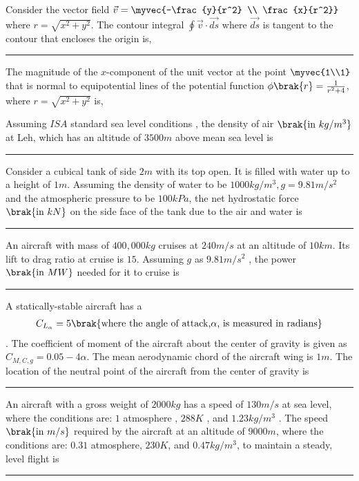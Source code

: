         \item Consider the vector field $\vec{v}=\myvec{-\frac{y}{r^2} \\ \frac{x}{r^2}}$ where $r= \sqrt{x^2+y^2}$. The contour integral $ \oint \vec{v} \cdot \vec{ds}$ where $\vec{ds}$ is tangent to the contour that encloses the origin is, \rule{2cm}{0.2pt} 
        \item The magnitude of the $x$-component of the unit vector at the point $\myvec{1\\1}$ that is normal to equipotential lines of the potential function $\phi\brak{r}=\frac{1}{r^2+4}$, where $r=\sqrt{x^2+y^2}$ is,
        \item Assuming $ISA$ standard sea level conditions , the density of air $\brak{\text{in } kg/m^3}$ at Leh, which has an altitude of $3500m$ above mean sea level is \rule{2cm}{0.2pt} 
        \item Consider a cubical tank of side $2 m$ with its top open. It is filled with water up to a height of $1 m$. Assuming the density of water to be $1000 kg/m^3, g = 9.81 m/s^2$ and the atmospheric pressure to be $100 kPa$, the net hydrostatic force $\brak{\text{in } kN}$ on the side face of the tank due to the air and water is \rule{2cm}{0.2pt} 
        \item An aircraft with mass of $400,000 kg$ cruises at $240 m/s$ at an altitude of $10 km$. Its lift to drag ratio at cruise is $15$. Assuming $g$ as $9.81 m/s^2$ , the power $\brak{\text{in } MW}$ needed for it to cruise is\rule{2cm}{0.2pt} 
        \item A statically-stable aircraft has a 
            \begin{align*}
                C_{L_{\alpha}}=5 \brak{\text{where the angle of attack,} \alpha \text{, is measured in radians}}
            \end{align*}. The coefficient of moment of the aircraft about the center of gravity is given as $C_{M,C,g}=0.05-4\alpha$. The mean aerodynamic chord of the aircraft wing is $1 m$. The location  of the neutral point of the aircraft from the center of gravity is \rule{2cm}{0.2pt} 

        \item An aircraft with a gross weight of $2000kg$ has a speed of $130m/s$ at sea level, where the conditions are: $1$ atmosphere , $288K$ , and $1.23 kg/m^3$ . The speed $\brak{\text{in } m/s}$ required by the aircraft at an altitude of $9000m$, where the conditions are: $0.31$ atmosphere, $230K$, and $0.47 kg/m^3$, to maintain a steady, level flight is \rule{2cm}{0.2pt}  

